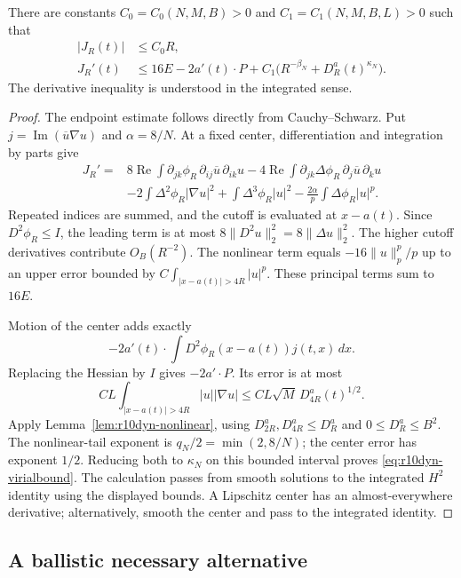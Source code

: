 \begin{lemma}
\label{lem:r10dyn-virial}
There are constants $C_0=C_0(N,M,B)>0$ and
$C_1=C_1(N,M,B,L)>0$ such that
\begin{align}
 |J_R(t)|&\le C_0R,\label{eq:r10dyn-endpoint}\\
 J_R'(t)&\le16E-2a'(t)\cdot P+
 C_1\bigl(R^{-\beta_N}+D_R^a(t)^{\kappa_N}\bigr).
 \label{eq:r10dyn-virialbound}
\end{align}
The derivative inequality is understood in the integrated sense.
\end{lemma}
\begin{proof}
The endpoint estimate follows directly from Cauchy--Schwarz. Put
$j=\operatorname{Im}(\overline u\nabla u)$ and $\alpha=8/N$.
At a fixed center, differentiation and integration by parts give
\begin{align*}
 J_R'={}&8\operatorname{Re}\int\partial_{jk}\phi_R\,
      \partial_{ij}\overline u\,\partial_{ik}u
 -4\operatorname{Re}\int\partial_{jk}\Delta\phi_R\,
      \partial_j\overline u\,\partial_ku\\
 &-2\int\Delta^2\phi_R|\nabla u|^2
 +\int\Delta^3\phi_R|u|^2
 -\frac{2\alpha}{p}\int\Delta\phi_R|u|^p.
\end{align*}
Repeated indices are summed, and the cutoff is evaluated at $x-a(t)$.
Since $D^2\phi_R\le I$, the leading term is at most
$8\|D^2u\|_2^2=8\|\Delta u\|_2^2$. The higher cutoff derivatives
contribute $O_B(R^{-2})$. The nonlinear term equals
$-16\|u\|_p^p/p$ up to an upper error bounded by
$C\int_{|x-a(t)|>4R}|u|^p$. These principal terms sum to $16E$.

Motion of the center adds exactly
\[
 -2a'(t)\cdot\int D^2\phi_R(x-a(t))j(t,x)\,dx.
\]
Replacing the Hessian by $I$ gives $-2a'\cdot P$. Its error is at most
\[
 C L\int_{|x-a(t)|>4R}|u||\nabla u|
 \le C L\sqrt M\,D_{4R}^a(t)^{1/2}.
\]
Apply Lemma~\ref{lem:r10dyn-nonlinear}, using
$D_{2R}^a,D_{4R}^a\le D_R^a$ and $0\le D_R^a\le B^2$.
The nonlinear-tail exponent is $q_N/2=\min(2,8/N)$; the
center error has exponent $1/2$. Reducing both to
$\kappa_N$ on this bounded interval proves
\eqref{eq:r10dyn-virialbound}. The calculation passes from smooth solutions
to the integrated $H^2$ identity using the displayed bounds. A Lipschitz
center has an almost-everywhere derivative; alternatively, smooth the
center and pass to the integrated identity.
\end{proof}

\subsection{A ballistic necessary alternative}

